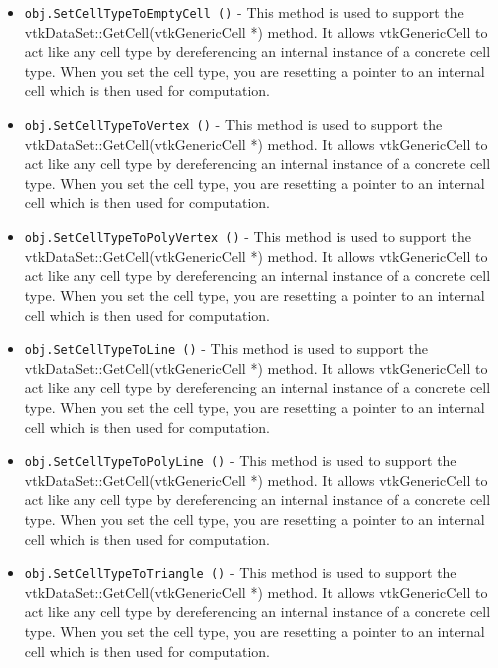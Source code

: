 \begin{itemize}
\item  \verb|obj.SetCellTypeToEmptyCell ()| -  This method is used to support the vtkDataSet::GetCell(vtkGenericCell *)
 method. It allows vtkGenericCell to act like any cell type by
 dereferencing an internal instance of a concrete cell type. When
 you set the cell type, you are resetting a pointer to an internal
 cell which is then used for computation.

\item  \verb|obj.SetCellTypeToVertex ()| -  This method is used to support the vtkDataSet::GetCell(vtkGenericCell *)
 method. It allows vtkGenericCell to act like any cell type by
 dereferencing an internal instance of a concrete cell type. When
 you set the cell type, you are resetting a pointer to an internal
 cell which is then used for computation.

\item  \verb|obj.SetCellTypeToPolyVertex ()| -  This method is used to support the vtkDataSet::GetCell(vtkGenericCell *)
 method. It allows vtkGenericCell to act like any cell type by
 dereferencing an internal instance of a concrete cell type. When
 you set the cell type, you are resetting a pointer to an internal
 cell which is then used for computation.

\item  \verb|obj.SetCellTypeToLine ()| -  This method is used to support the vtkDataSet::GetCell(vtkGenericCell *)
 method. It allows vtkGenericCell to act like any cell type by
 dereferencing an internal instance of a concrete cell type. When
 you set the cell type, you are resetting a pointer to an internal
 cell which is then used for computation.

\item  \verb|obj.SetCellTypeToPolyLine ()| -  This method is used to support the vtkDataSet::GetCell(vtkGenericCell *)
 method. It allows vtkGenericCell to act like any cell type by
 dereferencing an internal instance of a concrete cell type. When
 you set the cell type, you are resetting a pointer to an internal
 cell which is then used for computation.

\item  \verb|obj.SetCellTypeToTriangle ()| -  This method is used to support the vtkDataSet::GetCell(vtkGenericCell *)
 method. It allows vtkGenericCell to act like any cell type by
 dereferencing an internal instance of a concrete cell type. When
 you set the cell type, you are resetting a pointer to an internal
 cell which is then used for computation.


\end{itemize}
